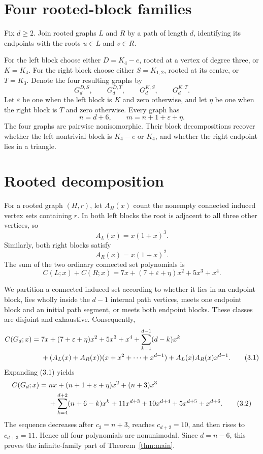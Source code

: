 \documentclass[11pt]{article}
\numberwithin{equation}{section}
\begin{document}
\section{Four rooted-block families}

Fix $d\geq2$. Join rooted graphs $L$ and $R$ by a path of length $d$, identifying its endpoints
with the roots $u\in L$ and $v\in R$.

For the left block choose either $D=K_4-e$, rooted at a vertex of degree three, or $K=K_4$. For
the right block choose either $S=K_{1,2}$, rooted at its centre, or $T=K_3$. Denote the four
resulting graphs by
\[
G_d^{D,S},\qquad G_d^{D,T},\qquad G_d^{K,S},\qquad G_d^{K,T}.
\]
Let $\varepsilon$ be one when the left block is $K$ and zero otherwise, and let $\eta$ be one when
the right block is $T$ and zero otherwise. Every graph has
\[
n=d+6,\qquad m=n+1+\varepsilon+\eta.
\]
The four graphs are pairwise nonisomorphic. Their block decompositions recover whether the left
nontrivial block is $K_4-e$ or $K_4$, and whether the right endpoint lies in a triangle.

\section{Rooted decomposition}

For a rooted graph $(H,r)$, let $A_H(x)$ count the nonempty connected induced vertex sets
containing $r$. In both left blocks the root is adjacent to all three other vertices, so
\[
A_L(x)=x(1+x)^3.
\]
Similarly, both right blocks satisfy
\[
A_R(x)=x(1+x)^2.
\]
The sum of the two ordinary connected set polynomials is
\[
C(L;x)+C(R;x)=7x+(7+\varepsilon+\eta)x^2+5x^3+x^4.
\]

We partition a connected induced set according to whether it lies in an endpoint block, lies wholly
inside the $d-1$ internal path vertices, meets one endpoint block and an initial path segment, or
meets both endpoint blocks. These classes are disjoint and exhaustive. Consequently,
\begin{align}
C(G_d;x)={}&7x+(7+\varepsilon+\eta)x^2+5x^3+x^4
 +\sum_{k=1}^{d-1}(d-k)x^k \notag\\
&+(A_L(x)+A_R(x))(x+x^2+\cdots+x^{d-1})
 +A_L(x)A_R(x)x^{d-1}.
\tag{3.1}
\end{align}
Expanding (3.1) yields
\begin{align}
C(G_d;x)={}&nx+(n+1+\varepsilon+\eta)x^2+(n+3)x^3 \notag\\
&+\sum_{k=4}^{d+2}(n+6-k)x^k
 +11x^{d+3}+10x^{d+4}+5x^{d+5}+x^{d+6}.
\tag{3.2}
\end{align}
The sequence decreases after $c_3=n+3$, reaches $c_{d+2}=10$, and then rises to
$c_{d+3}=11$. Hence all four polynomials are nonunimodal. Since $d=n-6$, this proves the
infinite-family part of Theorem~\ref{thm:main}.
\end{document}
